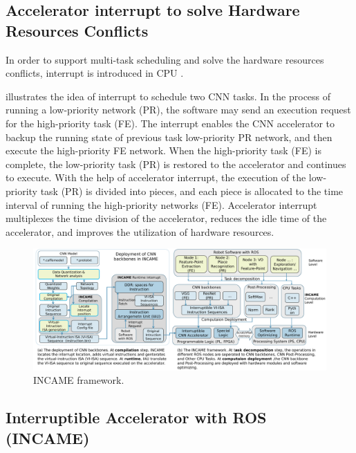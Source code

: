 \subsection{ Accelerator interrupt to solve Hardware Resources Conflicts }

In order to support multi-task scheduling and solve the hardware resources conflicts, interrupt is introduced in CPU \cite{jen1974processor}. 


 illustrates the idea of interrupt to schedule two CNN tasks. In the process of running a low-priority network (PR), the software may send an execution request for the high-priority task (FE). The interrupt enables the CNN accelerator to backup the running state of previous task low-priority PR network, and then execute the high-priority FE network. When the high-priority task (FE) is complete, the low-priority task (PR) is restored to the accelerator and continues to execute.
With the help of accelerator interrupt, the execution of the low-priority task (PR) is divided into pieces, and each piece is allocated to the time interval of running the high-priority networks (FE). 
Accelerator interrupt multiplexes the time division of the accelerator, reduces the idle time of the accelerator, and improves the utilization of hardware resources. 


\begin{figure}[t]
	\centering
    \includegraphics[width=0.99\linewidth]{fig/incame.pdf}
    \caption{ INCAME framework.}
	\label{fig:incame}
\end{figure}

\subsection{ Interruptible Accelerator with ROS (INCAME) }


